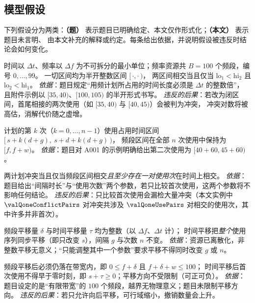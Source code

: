 \subsection{模型假设}

下列假设分为两类：\textbf{（题）} 表示题目已明确给定、本文仅作形式化；\textbf{（本文）} 表示题目未言明、
由本文补充的解释或约定。每条给出依据，并说明假设被违反时结论会如何变化。

\begin{assumption}[时频资源的离散性与半开性（题）]\label{as:discrete}
时间以 $\Delta t$、频率以 $\Delta f$ 为不可拆分的最小单位；频率资源共 $B=100$ 个频段，编号 $0,\dots,99$。
一切区间均为半开整数区间 $[\,\cdot,\cdot\,)$，
两区间相交当且仅当 $\mathrm{lo}_1<\mathrm{hi}_2$ 且 $\mathrm{lo}_2<\mathrm{hi}_1$。
\emph{依据}：题目规定“用频计划所占用的时间长度必须是 $\Delta t$ 的整数倍”，
且附件示例以 $[35,40)$、$[100,105)$ 的半开形式书写。
\emph{违反的后果}：若改为闭区间，首尾相接的两次使用（如 $[35,40)$ 与 $[40,45)$）会被判为冲突，
冲突对数将被高估，消解代价随之虚增。
\end{assumption}

\begin{assumption}[使用序列的周期性（题）]\label{as:period}
计划的第 $k$ 次（$k=0,\dots,n-1$）使用占用时间区间 $[\,s+k(d+g),\ s+d+k(d+g)\,)$，
频段区间在全部 $n$ 次使用中保持为 $[f,f+w)$。
\emph{依据}：题目对 A001 的示例明确给出第二次使用为 $[40+60,45+60)$。
\end{assumption}

\begin{assumption}[冲突定义在整个使用序列上（本文）]\label{as:conflict}
两计划冲突当且仅当频段区间相交\emph{且至少存在一对使用次}在时间上相交。
\emph{依据}：题目给出“间隔时长”与“使用次数”两个参数，若只比较首次使用，这两个参数将不影响任何结论。
\emph{违反的后果}：只比较首次使用会漏检大量冲突（本文实例中 $\valQoneConflictPairs$ 对冲突共涉及
$\valQoneUsePairs$ 对相交的使用次，其中许多并非首次）。
\end{assumption}

\begin{assumption}[平移的整数性与同步性（本文）]\label{as:shift}
频段平移量 $\delta$ 与时间平移量 $\tau$ 均为整数（以 $\Delta f$、$\Delta t$ 计）；
时间平移把\emph{整个}使用序列同步平移（即只改变 $s$），间隔 $g$ 与次数 $n$ 不变。
\emph{依据}：资源已离散化，非整数平移无意义；“只能调整其中一个参数”要求平移不得同时改变 $g$ 或 $n$。
\end{assumption}

\begin{assumption}[平移的可行域（本文）]\label{as:domain}
频段平移后必须仍落在带宽内，即 $0\le f+\delta$ 且 $f+\delta+w\le 100$；
时间平移后首次使用不得早于零时刻，即 $s+\tau\ge 0$；平移方向不受限制（可正可负）。
\emph{依据}：题目设定的是“有限带宽”的 $100$ 个频段，越界无物理意义；题目未限制平移方向。
\emph{违反的后果}：若只允许向后平移，可行域缩小，撤销数量会上升。
\end{assumption}


